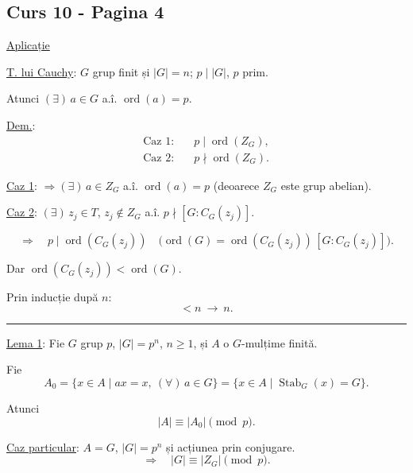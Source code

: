 
\subsection*{Curs 10 - Pagina 4}

\noindent\underline{Aplicație}

\medskip
\noindent\underline{T. lui Cauchy}: $G$ grup finit și $|G|=n$;
$p\mid |G|$, $p$ prim.

\medskip
\noindent Atunci $(\exists)\,a\in G$ a.î. $\operatorname{ord}(a)=p$.

\bigskip
\noindent\underline{Dem.}:
\begin{align*}
\text{Caz 1:}\quad & p\mid\operatorname{ord}(Z_G),\\
\text{Caz 2:}\quad & p\nmid\operatorname{ord}(Z_G).
\end{align*}

\noindent\underline{Caz 1}: $\Longrightarrow (\exists)\,a\in Z_G$
a.î. $\operatorname{ord}(a)=p$ (deoarece $Z_G$ este grup abelian).

\medskip
\noindent\underline{Caz 2}: $(\exists)\,z_j\in T$, $z_j\notin Z_G$
a.î. $p\nmid [G:C_G(z_j)]$.

\[
\Longrightarrow\quad p\mid\operatorname{ord}(C_G(z_j))
\quad\bigl(\operatorname{ord}(G)
=\operatorname{ord}(C_G(z_j))\,[G:C_G(z_j)]\bigr).
\]

\noindent Dar $\operatorname{ord}(C_G(z_j))<\operatorname{ord}(G)$.

\medskip
\noindent Prin inducție după $n$:
\[
<n\ \longrightarrow\ n.
\]

\bigskip
\hrule
\bigskip

\noindent\underline{Lema 1}: Fie $G$ grup $p$, $|G|=p^n$,
$n\geq 1$, și $A$ o $G$-mulțime finită.

\medskip
\noindent Fie
\[
A_0=\{x\in A\mid ax=x,\ (\forall)\,a\in G\}
   =\{x\in A\mid \operatorname{Stab}_G(x)=G\}.
\]

\noindent Atunci
\[
|A|\equiv |A_0|\pmod p.
\]

\bigskip
\noindent\underline{Caz particular}: $A=G$, $|G|=p^n$
și acțiunea prin conjugare.
\[
\Longrightarrow\quad |G|\equiv |Z_G|\pmod p.
\]

